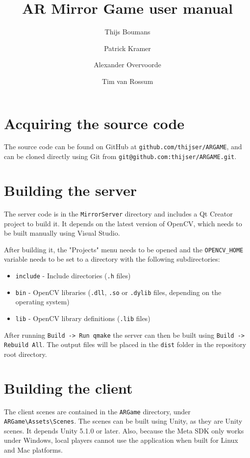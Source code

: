 \documentclass{report}
\title{AR Mirror Game user manual}
\author{Thijs Boumans \and Patrick Kramer \and Alexander Overvoorde \and Tim van Rossum}
\begin{document}
\maketitle

\section*{Acquiring the source code}
	The source code can be found on GitHub at \texttt{github.com/thijser/ARGAME},
	and can be cloned directly using Git from \verb#git@github.com:thijser/ARGAME.git#.

\section*{Building the server}
	The server code is in the \verb#MirrorServer# directory and includes a Qt
	Creator project to build it. It depends on the latest version of OpenCV, which
	needs to be built manually using Visual Studio.
	
	After building it, the "Projects" menu needs to be opened and the
	\verb#OPENCV_HOME# variable needs to be set to a directory with the following
	subdirectories:

	\begin{itemize}
	    \item \verb#include# - Include directories (\texttt{.h} files)
	    \item \verb#bin# - OpenCV libraries (\texttt{.dll}, \texttt{.so} or \texttt{.dylib} files, depending on the operating system)
	    \item \verb#lib# - OpenCV library definitions (\texttt{.lib} files)
	\end{itemize}
	
	After running \verb#Build -> Run qmake# the server can then be built using
	\verb#Build -> Rebuild All#. The output files will be placed in the \verb#dist#
	folder in the repository root directory.

\section*{Building the client}
	The client scenes are contained in the \verb#ARGame# directory, under 
	\verb#ARGame\Assets\Scenes#. The scenes can be built using Unity, as they are 
	Unity scenes. It depends Unity 5.1.0 or later. Also, because the Meta SDK only 
	works under Windows, local players cannot use the application when built for 
	Linux and Mac platforms.
	
\end{document}

